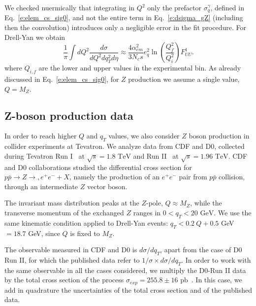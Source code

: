\documentclass[aps,preprintnumbers,showpacs,nofootinbib,superscriptaddress,floatfix]{revtex4}
\begin{document}
We checked nuermically that integrating in $Q^2$ only the prefactor
$\sigma_q^\gamma$, defined in Eq.~\ref{e:elem_cs_sig0}, and not the entire
term in Eq.~\ref{e:dsigma_gZ} (including then the convolution) introduces only
a negligible error in the fit procedure. For Drell-Yan we obtain
\begin{equation}
\frac{1}{\pi} \int dQ^2 \frac{d\sigma}{dQ^2dq^2_T d\eta}
\approx 
\frac{4\alpha_{em}^2}{3 N_c s} e_q^2 \ln \left( \frac{Q_f^2}{Q_i^2} \right)
F_{UU}^1. 
\end{equation}
where $Q_{i,f}$ are the lower and upper values in the experimental bin. 
As already discussed in Eq.~\eqref{e:elem_cs_sig0}, 
for $Z$ production we assume a single value, $Q=M_Z$.

\subsection{Z-boson production data}
\label{ss:zboson}

In order to reach higher $Q$ and $q_T$ values, we also consider $Z$ boson production in collider experiments at Tevatron. 
We analyze data from CDF and D0, collected during Tevatron Run I~\cite{Affolder:1999jh,Abbott:1999wk} at $\sqrt{s}=1.8\text{ TeV}$ and Run II~\cite{Aaltonen:2012fi,Abazov:2007ac} at $\sqrt{s}=1.96\text{ TeV}$. CDF and D0 collaborations studied the differential cross section for $p\bar{p}\rightarrow Z \rightarrow, e^+e^- + X$, namely the production of an $e^+e^-$ pair from $p\bar{p}$ collision,  through an intermediate $Z$ vector boson. 

The invariant mass distribution peaks at the $Z$-pole, $Q \approx M_Z$, while the transverse momentum of the exchanged $Z$ ranges in $0< q_T < 20 \text{ GeV}$.
We use the same kinematic condition applied to Drell-Yan events:  $q_T < 0.2\ Q + 0.5$ GeV $ = 18.7$ GeV, since $Q$ is fixed to $M_Z$. 

The observable measured in CDF and D0 is $d\sigma /dq_T$,  apart from the case of D0 Run II, for which the published data refer to $1/\sigma \times d\sigma/dq_T$. In order to work with the same observable in all the cases considered, we multiply the D0-Run II data by the total cross section of the process $\sigma_{exp} = 255.8 \pm 16 \text{ pb}$~\cite{Abulencia:2005ix}. In this case, we add in quadrature the uncertainties of the total cross section and of the published data. 
\end{document}

